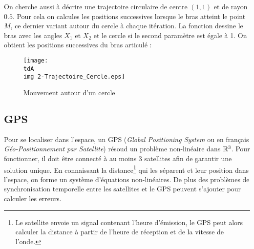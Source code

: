 		On cherche aussi à décrire une trajectoire circulaire de centre $(1,1)$ et de rayon $0.5$.
		Pour cela on calcules les  positions successives lorsque le bras atteint le point $M$, ce dernier variant autour du cercle à chaque itération.
		La fonction  dessine le bras avec les angles $X_1$ et $X_2$ et le cercle si le second paramètre est égale à 1. 
		On obtient les positions successives du bras articulé :

		\begin{figure}[H]
			\centering
			\texttt{[image: \\tdA\\img 2-Trajectoire\_Cercle.eps]}
			\caption{Mouvement autour d'un cercle}
			\label{img-1-brasCercle}
		\end{figure}


		






	\subsection{GPS}
	\label{ch-1-gps}

		Pour se localiser dans l'espace, un GPS (\textit{Global Positioning System} ou en français \textit{Géo-Positionnement par Satellite}) résoud un problème non-linéaire dans $\mathbb{R}^3$. Pour fonctionner, il doit être connecté à au moins 3 satellites afin de garantir une solution unique. En connaissant la distance\footnote{Le satellite envoie un signal contenant l'heure d'émission, le GPS peut alors calculer la distance à partir de l'heure de réception et de la vitesse de l'onde.} qui les séparent et leur position dans l'espace, on forme un système d'équations non-linéaires.
		De plus des problèmes de synchronisation temporelle entre les satellites et le GPS peuvent s'ajouter pour calculer les erreurs.

